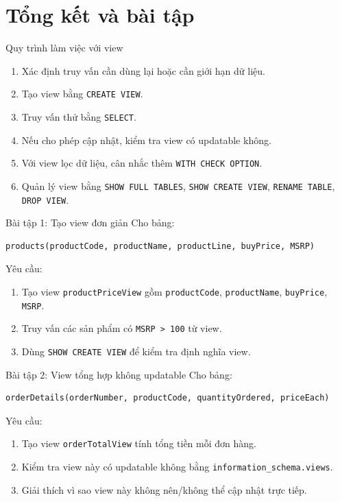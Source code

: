 \documentclass[aspectratio=169,11pt]{beamer}
\begin{document}
\section{Tổng kết và bài tập}

\begin{frame}{Quy trình làm việc với view}
\begin{enumerate}
    \item Xác định truy vấn cần dùng lại hoặc cần giới hạn dữ liệu.
    \item Tạo view bằng \texttt{CREATE VIEW}.
    \item Truy vấn thử bằng \texttt{SELECT}.
    \item Nếu cho phép cập nhật, kiểm tra view có updatable không.
    \item Với view lọc dữ liệu, cân nhắc thêm \texttt{WITH CHECK OPTION}.
    \item Quản lý view bằng \texttt{SHOW FULL TABLES}, \texttt{SHOW CREATE VIEW}, \texttt{RENAME TABLE}, \texttt{DROP VIEW}.
\end{enumerate}
\end{frame}

\begin{frame}[fragile]{Bài tập 1: Tạo view đơn giản}
Cho bảng:
\begin{lstlisting}
products(productCode, productName, productLine, buyPrice, MSRP)
\end{lstlisting}

Yêu cầu:
\begin{enumerate}
    \item Tạo view \texttt{productPriceView} gồm \texttt{productCode}, \texttt{productName}, \texttt{buyPrice}, \texttt{MSRP}.
    \item Truy vấn các sản phẩm có \texttt{MSRP > 100} từ view.
    \item Dùng \texttt{SHOW CREATE VIEW} để kiểm tra định nghĩa view.
\end{enumerate}
\end{frame}

\begin{frame}[fragile]{Bài tập 2: View tổng hợp không updatable}
Cho bảng:
\begin{lstlisting}
orderDetails(orderNumber, productCode, quantityOrdered, priceEach)
\end{lstlisting}

Yêu cầu:
\begin{enumerate}
    \item Tạo view \texttt{orderTotalView} tính tổng tiền mỗi đơn hàng.
    \item Kiểm tra view này có updatable không bằng \texttt{information\_schema.views}.
    \item Giải thích vì sao view này không nên/không thể cập nhật trực tiếp.
\end{enumerate}
\end{frame}
\end{document}
